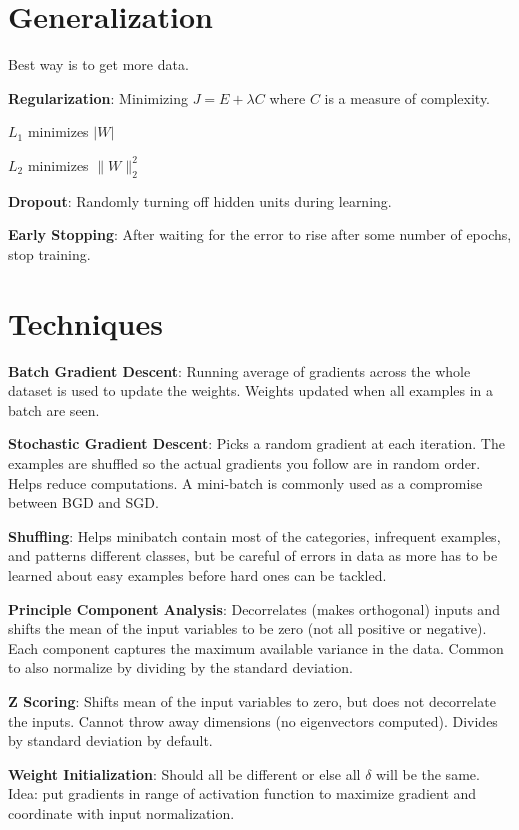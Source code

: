 \section{Generalization}
Best way is to get more data.

\textbf{Regularization}: Minimizing $J = E + \lambda C$ where $C$ is a measure of complexity.

$L_1$ minimizes $|W|$

$L_2$ minimizes $\| W\|_2^2$

\textbf{Dropout}: Randomly turning off hidden units during learning.

\textbf{Early Stopping}: After waiting for the error to rise after some number of epochs, stop training.

\section{Techniques}

\textbf{Batch Gradient Descent}: Running average of gradients across the whole dataset is used to update the weights. Weights updated when all examples in a batch are seen.

\textbf{Stochastic Gradient Descent}: Picks a random gradient at each iteration. The examples are shuffled so the actual gradients you follow are in random order. Helps reduce computations. A mini-batch is commonly used as a compromise between BGD and SGD.

\textbf{Shuffling}: Helps minibatch contain most of the categories, infrequent examples, and patterns different classes, but be careful of errors in data as more has to be learned about easy examples before hard ones can be tackled. 

\textbf{Principle Component Analysis}: Decorrelates (makes orthogonal) inputs and shifts the mean of the input variables to be zero (not all positive or negative). Each component captures the maximum available variance in the data. Common to also normalize by dividing by the standard deviation.

\textbf{Z Scoring}: Shifts mean of the input variables to zero, but does not decorrelate the inputs. Cannot throw away dimensions (no eigenvectors computed). Divides by standard deviation by default.

\textbf{Weight Initialization}: Should all be different or else all $\delta$ will be the same. Idea: put gradients in range of activation function to maximize gradient and coordinate with input normalization.
 
